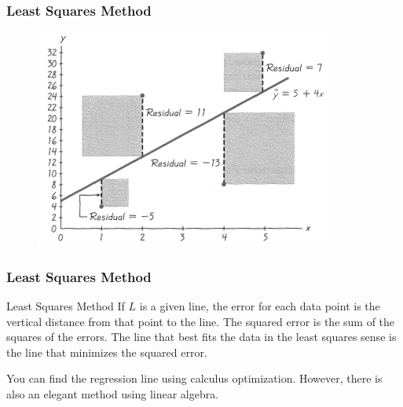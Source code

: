\documentclass[xcolor=dvipsnames]{beamer}
\begin{document}
\begin{frame}
  \frametitle{Least Squares Method}
    \begin{figure}[h]
    \includegraphics[scale=1]{./diagrams/lsqu4.png}
    \end{figure}
\end{frame}



\begin{frame}
  \frametitle{Least Squares Method}
  \begin{block}{Least Squares Method}
    If $L$ is a given line, the \alert{error} for each data point is
    the vertical distance from that point to the line. The
    \alert{squared error} is the sum of the squares of the errors. The
    line that best fits the data in the least squares sense is the
    line that minimizes the squared error.
  \end{block}

  \bigskip

  You can find the \alert{regression line} using calculus
  optimization. However, there is also an elegant method using linear
  algebra.
\end{frame}
\end{document}

